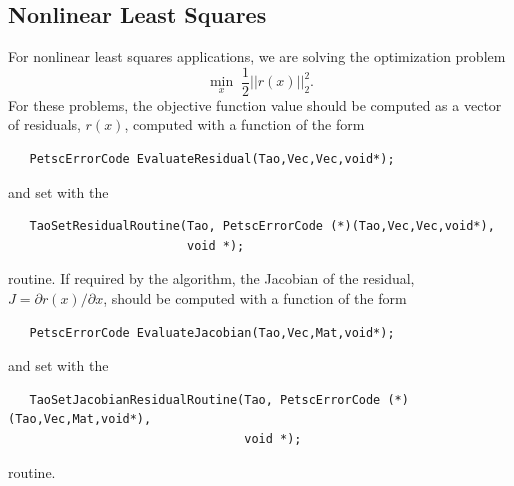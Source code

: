 \documentclass[]{book}
\begin{document}
\subsection{Nonlinear Least Squares}\label{sec_evalsof}
For nonlinear least squares applications, we are solving
the optimization problem
\begin{equation*}
\min_{x} \;\frac{1}{2}||r(x)||_2^2.
\end{equation*}
For these problems, the objective function value should be computed as a 
vector of residuals, $r(x)$, computed with a function of the form
\begin{verbatim}
   PetscErrorCode EvaluateResidual(Tao,Vec,Vec,void*);
\end{verbatim}
and set with the
\begin{verbatim}
   TaoSetResidualRoutine(Tao, PetscErrorCode (*)(Tao,Vec,Vec,void*), 
                         void *);
\end{verbatim}
routine. If required by the algorithm, the Jacobian of the residual, $J = \partial r(x) / \partial x$, 
should be computed with a function of the form 
\begin{verbatim}
   PetscErrorCode EvaluateJacobian(Tao,Vec,Mat,void*);
\end{verbatim}
and set with the 
\begin{verbatim}
   TaoSetJacobianResidualRoutine(Tao, PetscErrorCode (*)(Tao,Vec,Mat,void*),
                                 void *);
\end{verbatim}
routine.

\end{document}
